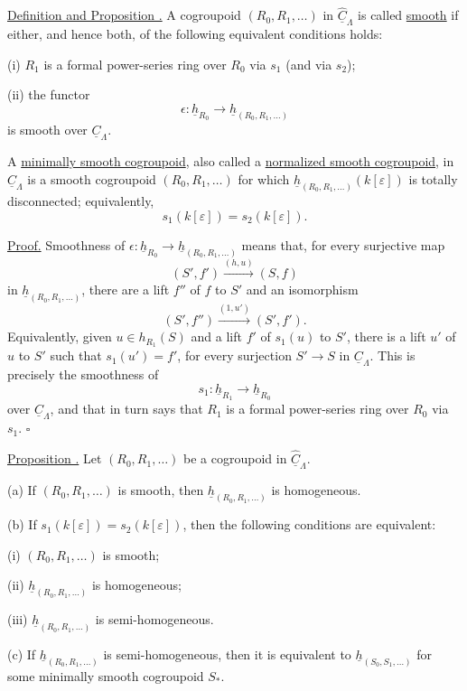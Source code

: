 \underline{Definition and Proposition .} A cogroupoid
$(R_0,R_1,\ldots)$ in $\widehat{\underline C}_\Lambda$ is called
\underline{smooth} if either, and hence both, of the following
equivalent conditions holds:

(i) $R_1$ is a formal power-series ring over $R_0$ via $s_1$ (and
via $s_2$);

(ii) the functor
\[
 \epsilon:\underline h_{R_0}
 \longrightarrow\underline h_{(R_0,R_1,\ldots)}
\]
is smooth over $\underline C_\Lambda$.

A \underline{minimally smooth cogroupoid}, also called a
\underline{normalized smooth cogroupoid}, in
$\widehat{\underline C}_\Lambda$ is a smooth cogroupoid
$(R_0,R_1,\ldots)$ for which
$\underline h_{(R_0,R_1,\ldots)}(k[\varepsilon])$ is totally
disconnected; equivalently,
\[
 s_1(k[\varepsilon])=s_2(k[\varepsilon]).
\]

\underline{Proof.} Smoothness of
$\epsilon:\underline h_{R_0}\to
\underline h_{(R_0,R_1,\ldots)}$ means that, for every surjective
map
\[
 (S',f')\xrightarrow{(h,u)}(S,f)
\]
in $\underline h_{(R_0,R_1,\ldots)}$, there are a lift $f''$ of $f$
to $S'$ and an isomorphism
\[
 (S',f'')\xrightarrow{(1,u')}(S',f').
\]
Equivalently, given $u\in h_{R_1}(S)$ and a lift $f'$ of $s_1(u)$
to $S'$, there is a lift $u'$ of $u$ to $S'$ such that
$s_1(u')=f'$, for every surjection $S'\to S$ in
$\underline C_\Lambda$. This is precisely the smoothness of
\[
 s_1:\underline h_{R_1}\longrightarrow\underline h_{R_0}
\]
over $\underline C_\Lambda$, and that in turn says that $R_1$ is a
formal power-series ring over $R_0$ via $s_1$. \hfill$\square$

\underline{Proposition .} Let $(R_0,R_1,\ldots)$ be a cogroupoid
in $\widehat{\underline C}_\Lambda$.

(a) If $(R_0,R_1,\ldots)$ is smooth, then
$\underline h_{(R_0,R_1,\ldots)}$ is homogeneous.

(b) If $s_1(k[\varepsilon])=s_2(k[\varepsilon])$, then the following
conditions are equivalent:

(i) $(R_0,R_1,\ldots)$ is smooth;

(ii) $\underline h_{(R_0,R_1,\ldots)}$ is homogeneous;

(iii) $\underline h_{(R_0,R_1,\ldots)}$ is semi-homogeneous.


(c) If $\underline h_{(R_0,R_1,\ldots)}$ is semi-homogeneous, then
it is equivalent to $\underline h_{(S_0,S_1,\ldots)}$ for some
minimally smooth cogroupoid $S_*$. 

